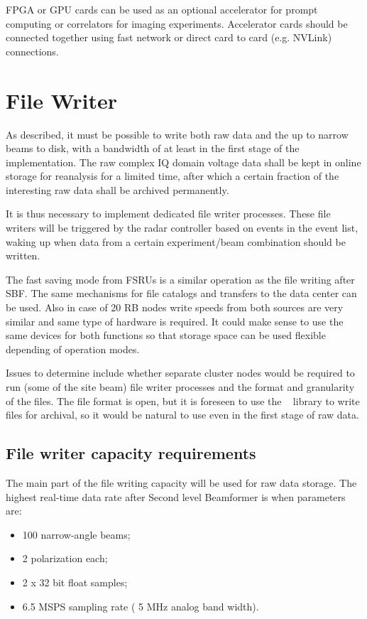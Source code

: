 \documentclass[12pt,a4paper]{article}
\begin{document}
FPGA or GPU cards can be used as an optional accelerator for prompt computing or correlators for imaging experiments. 
Accelerator cards should be connected together using fast network or direct card to card (e.g. NVLink) connections.
\fi

\section{File Writer}
\label{sec:filewriter}

As described, it must be possible to write both raw \RB data and the up to \NNB narrow beams to disk, with a bandwidth of at least \NBW in the first stage of the \ED implementation. 
 The raw complex IQ domain voltage data shall be kept in online storage for reanalysis for a limited time, after which a certain fraction of the interesting raw data shall be archived permanently.  
 
 It is thus necessary to implement dedicated file writer processes. These file writers will be triggered by the radar controller based on events in the event list, waking up when data from a certain experiment/beam combination should be written. 

The fast saving mode from FSRUs is a similar operation as the file writing after SBF. 
The same mechanisms for file catalogs and transfers to the data center can be used. 
Also in case of 20 RB nodes write speeds from both sources are very similar and same type of hardware is required. 
It could make sense to use the same devices for both functions so that storage space can be used flexible depending of operation modes. 

Issues to determine include whether separate cluster nodes would be required to run (some of the site beam) file writer processes and the format and granularity of the files. 
The file format is open, but it is foreseen to use the \HDF~\cite{hdf} library to write files for archival, so it would be natural to use \HDF even in the first stage of raw data.


\subsection{File writer capacity requirements}
The main part of the file writing capacity will be used for raw data storage. The highest real-time data rate after Second level Beamformer is when parameters are:
\begin{itemize}
\item 100 narrow-angle beams;
\item 2 polarization each;
\item 2 x 32 bit float samples; %
\item 6.5 MSPS sampling rate ( 5 MHz analog band width).
\end{itemize}
\end{document}
